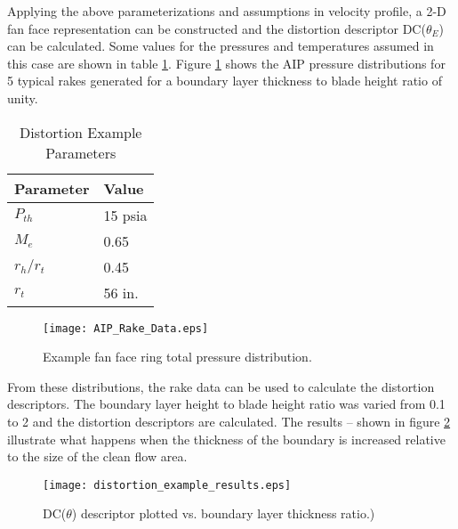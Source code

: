 				Applying the above parameterizations and assumptions in velocity profile, a 2-D fan face representation can be constructed and the distortion descriptor DC($\theta_E$) can be calculated.  Some values for the pressures and temperatures assumed in this case are shown in table \ref{Distortion_Example_Table}.  Figure \ref{AIP_Rake_Data} shows the AIP pressure distributions for 5 typical rakes generated for a boundary layer thickness to blade height ratio of unity.
				\begin{table}[htp]
					\begin{center}
						\begin{tabular}{p{3cm} | p{3cm} } 
							\hline
							Parameter & Value \\ 
							\hline 
							$P_{th}$ & 15 psia \\ 
							$M_e$ & 0.65 \\ 
							$r_h/r_t$ & 0.45 \\ 
							$r_t$ & 56 in. \\ 			
							\hline
							\hline
						\end{tabular}
						\caption{Distortion Example Parameters}
						\label{Distortion_Example_Table}
					\end{center}
				\end{table}  
				\begin{figure}[htp]
					\centering
					\texttt{[image: AIP\_Rake\_Data.eps]}
					\caption{Example fan face ring total pressure distribution.}
					\label{AIP_Rake_Data}
				\end{figure}
				From these distributions, the rake data can be used to calculate the distortion descriptors.  The boundary layer height to blade height ratio was varied from 0.1 to 2 and the distortion descriptors are calculated.  The results -- shown in figure \ref{distortion_example_results} illustrate what happens when the thickness of the boundary is increased relative to the size of the clean flow area.
				\begin{figure}[htp]
					\centering
					\texttt{[image: distortion\_example\_results.eps]}
					\caption{DC($\theta$) descriptor plotted vs. boundary layer thickness ratio.)}
					\label{distortion_example_results}
				\end{figure}
							

